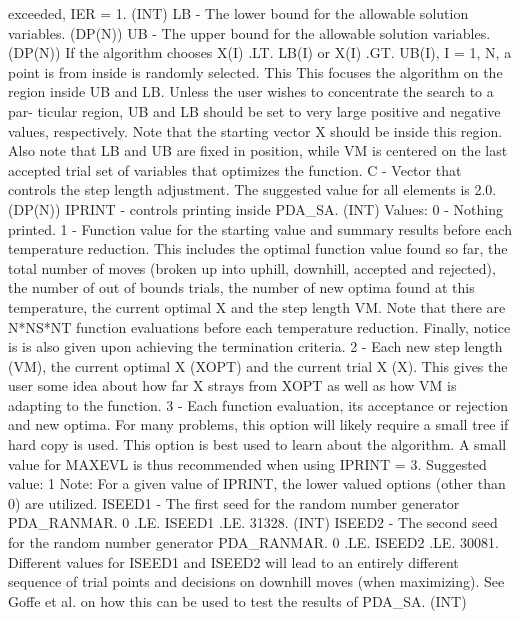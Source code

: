 \documentclass[11pt,twoside,nolof]{starlink}
\begin{document}
\begin{terminalv}
             exceeded, IER = 1. (INT)
    LB - The lower bound for the allowable solution variables. (DP(N))
    UB - The upper bound for the allowable solution variables. (DP(N))
         If the algorithm chooses X(I) .LT. LB(I) or X(I) .GT. UB(I),
         I = 1, N, a point is from inside is randomly selected. This
         This focuses the algorithm on the region inside UB and LB.
         Unless the user wishes to concentrate the search to a par-
         ticular region, UB and LB should be set to very large positive
         and negative values, respectively. Note that the starting
         vector X should be inside this region. Also note that LB and
         UB are fixed in position, while VM is centered on the last
         accepted trial set of variables that optimizes the function.
    C - Vector that controls the step length adjustment. The suggested
        value for all elements is 2.0. (DP(N))
    IPRINT - controls printing inside PDA_SA. (INT)
             Values: 0 - Nothing printed.
                     1 - Function value for the starting value and
                         summary results before each temperature
                         reduction. This includes the optimal
                         function value found so far, the total
                         number of moves (broken up into uphill,
                         downhill, accepted and rejected), the
                         number of out of bounds trials, the
                         number of new optima found at this
                         temperature, the current optimal X and
                         the step length VM. Note that there are
                         N*NS*NT function evaluations before each
                         temperature reduction. Finally, notice is
                         is also given upon achieving the termination
                         criteria.
                     2 - Each new step length (VM), the current optimal
                         X (XOPT) and the current trial X (X). This
                         gives the user some idea about how far X
                         strays from XOPT as well as how VM is adapting
                         to the function.
                     3 - Each function evaluation, its acceptance or
                         rejection and new optima. For many problems,
                         this option will likely require a small tree
                         if hard copy is used. This option is best
                         used to learn about the algorithm. A small
                         value for MAXEVL is thus recommended when
                         using IPRINT = 3.
             Suggested value: 1
             Note: For a given value of IPRINT, the lower valued
                   options (other than 0) are utilized.
    ISEED1 - The first seed for the random number generator PDA_RANMAR.
             0 .LE. ISEED1 .LE. 31328. (INT)
    ISEED2 - The second seed for the random number generator PDA_RANMAR.
             0 .LE. ISEED2 .LE. 30081. Different values for ISEED1
             and ISEED2 will lead to an entirely different sequence
             of trial points and decisions on downhill moves (when
             maximizing). See Goffe et al. on how this can be used
             to test the results of PDA_SA. (INT)


\end{terminalv}
\end{document}

